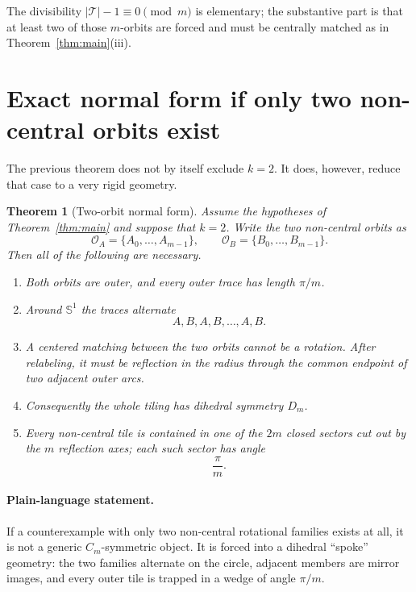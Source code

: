 \documentclass[10.5pt]{article}
\newtheorem{theorem}{Theorem}
\theoremstyle{remark}
\newcommand{\Sph}{\mathbb S}
\begin{document}
The divisibility $|\mathcal T|-1\equiv0\pmod m$ is elementary; the substantive part is that at least two of those $m$-orbits are forced and must be centrally matched as in Theorem~\ref{thm:main}(iii).

\section{Exact normal form if only two non-central orbits exist}

The previous theorem does not by itself exclude $k=2$. It does, however, reduce that case to a very rigid geometry.

\begin{theorem}[Two-orbit normal form]\label{thm:twoorbit}
Assume the hypotheses of Theorem~\ref{thm:main} and suppose that $k=2$. Write the two non-central orbits as
\[
 \mathcal O_A=\{A_0,\ldots,A_{m-1}\},
 \qquad
 \mathcal O_B=\{B_0,\ldots,B_{m-1}\}.
\]
Then all of the following are necessary.

\begin{enumerate}[label=\textup{(\alph*)}]
\item Both orbits are outer, and every outer trace has length $\pi/m$.

\item Around $\Sph^1$ the traces alternate
\[
 A,B,A,B,\ldots,A,B.
\]

\item A centered matching between the two orbits cannot be a rotation. After relabeling, it must be reflection in the radius through the common endpoint of two adjacent outer arcs.

\item Consequently the whole tiling has dihedral symmetry $D_m$.

\item Every non-central tile is contained in one of the $2m$ closed sectors cut out by the $m$ reflection axes; each such sector has angle
\[
 \frac{\pi}{m}.
\]
\end{enumerate}
\end{theorem}

\paragraph{Plain-language statement.}
If a counterexample with only two non-central rotational families exists at all, it is not a generic $C_m$-symmetric object. It is forced into a dihedral ``spoke'' geometry: the two families alternate on the circle, adjacent members are mirror images, and every outer tile is trapped in a wedge of angle $\pi/m$.
\end{document}
